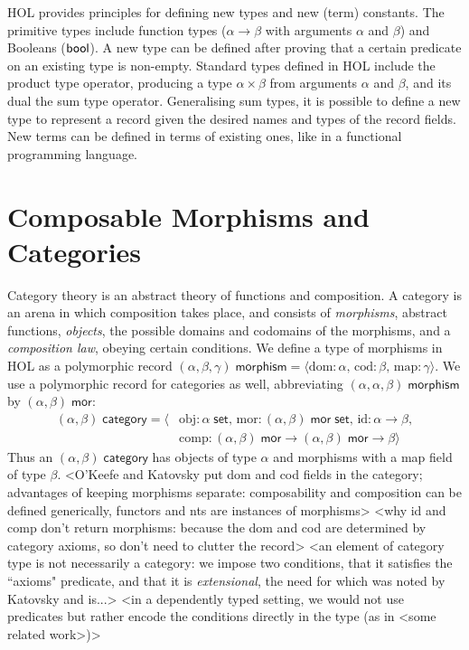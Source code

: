 \documentclass[twoside,titlepage,11pt]{article}
\begin{document}
HOL provides principles for defining new types and new (term) constants.
The primitive types include function types ($\alpha\to\beta$ with arguments $\alpha$ and $\beta$) and Booleans ($\mathsf{bool}$).
A new type can be defined after proving that a certain predicate on an existing type is non-empty.
Standard types defined in HOL include the product type operator, producing a type $\alpha\times\beta$ from arguments $\alpha$ and $\beta$, and its dual the sum type operator.
Generalising sum types, it is possible to define a new type to represent a record given the desired names and types of the record fields.
New terms can be defined in terms of existing ones, like in a functional programming language.
\section{Composable Morphisms and Categories}%
Category theory is an abstract theory of functions and composition.
A category is an arena in which composition takes place, and consists of \emph{morphisms}, abstract functions, \emph{objects}, the possible domains and codomains of the morphisms, and a \emph{composition law}, obeying certain conditions.
We define a type of morphisms in HOL as a polymorphic record $(\alpha,\beta,\gamma)\;\mathsf{morphism}=\langle\mathrm{dom}:\alpha,\,\mathrm{cod}:\beta,\,\mathrm{map}:\gamma\rangle$.
We use a polymorphic record for categories as well, abbreviating $(\alpha,\alpha,\beta)\;\mathsf{morphism}$ by $(\alpha,\beta)\;\mathsf{mor}$:
\begin{align*}
(\alpha,\beta)\;\mathsf{category}=\langle&\mathrm{obj}:\alpha\;\mathsf{set},\,\mathrm{mor}:(\alpha,\beta)\;\mathsf{mor}\;\mathsf{set},\,\mathrm{id}:\alpha\to\beta,\\&\mathrm{comp}:(\alpha,\beta)\;\mathsf{mor}\to(\alpha,\beta)\;\mathsf{mor}\to\beta\rangle
\end{align*}
Thus an $(\alpha,\beta)\;\mathsf{category}$ has objects of type $\alpha$ and morphisms with a map field of type $\beta$.
<O'Keefe and Katovsky put dom and cod fields in the category; advantages of keeping morphisms separate: composability and composition can be defined generically, functors and nts are instances of morphisms>
<why id and comp don't return morphisms: because the dom and cod are determined by category axioms, so don't need to clutter the record>
<an element of category type is not necessarily a category: we impose two conditions, that it satisfies the ``axioms" predicate, and that it is \emph{extensional}, the need for which was noted by Katovsky and is...>
<in a dependently typed setting, we would not use predicates but rather encode the conditions directly in the type (as in <some related work>)>
\end{document}
